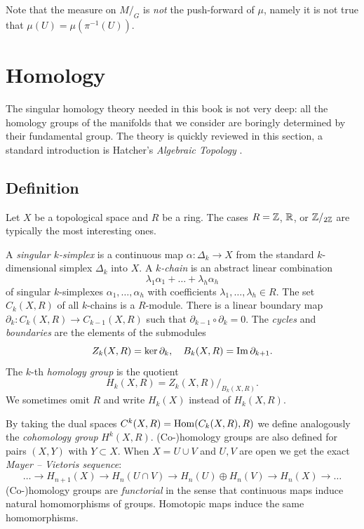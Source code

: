 Note that the measure on $M/_G$ is \emph{not} the push-forward of $\mu$, namely it is not true that $\mu(U) = \mu(\pi^{-1}(U))$.

\section{Homology}
The singular homology theory needed in this book is not very deep: all the homology groups of the manifolds that we consider are boringly determined by their fundamental group. The theory is quickly reviewed in this section, a standard introduction is Hatcher's \emph{Algebraic Topology} \cite{HAT}.

\subsection{Definition}
Let $X$ be a topological space and $R$ be a ring. The cases $R = \mathbb{Z}$, $\mathbb{R}$, or $\mathbb{Z}/_{2\mathbb{Z}}$ are typically the most interesting ones.

A \emph{singular $k$-simplex} is a continuous map $\alpha\colon \Delta_k \to X$ from the standard  $k$-dimensional simplex $\Delta_k$ into $X$. A \emph{$k$-chain} is an abstract linear combination
$$\lambda_1\alpha_1+\ldots +\lambda_h\alpha_h$$
of singular $k$-simplexes $\alpha_1,\ldots,\alpha_h$ with coefficients $\lambda_1,\ldots,\lambda_h \in R$. The set $C_k(X,R)$ of all $k$-chains is a $R$-module. There is a linear boundary map $\partial_k\colon C_k(X,R) \to C_{k-1}(X,R)$ such that $\partial_{k-1}\circ \partial_k=0$. The \emph{cycles} and \emph{boundaries} are the elements of the submodules  
$$Z_k(X,R) = \ker \partial_k, \quad  B_k(X,R) = {\rm Im\,} \partial_{k+1}.$$
The $k$-th \emph{homology group} is the quotient
$$H_k(X,R) = Z_k(X,R)/_{B_k(X,R)}.$$
We sometimes omit $R$ and write $H_k(X)$ instead of $H_k(X,R)$. 

By taking the dual spaces $C^k(X, R) = {\rm Hom}(C_k(X,R), R)$ we define analogously the \emph{cohomology group} $H^k(X,R)$. (Co-)homology groups are also defined for pairs $(X,Y)$ with $Y\subset X$. When $X=U\cup V$ and $U,V$ are open we get the exact \emph{Mayer -- Vietoris sequence}:
$$\ldots \longrightarrow H_{n+1}(X) \longrightarrow H_n(U\cap V) \longrightarrow H_n(U) \oplus H_n(V) \longrightarrow H_n(X) \longrightarrow\ldots$$
(Co-)homology groups are \emph{functorial} in the sense that continuous maps induce natural homomorphisms of groups. Homotopic maps induce the same homomorphisms.

